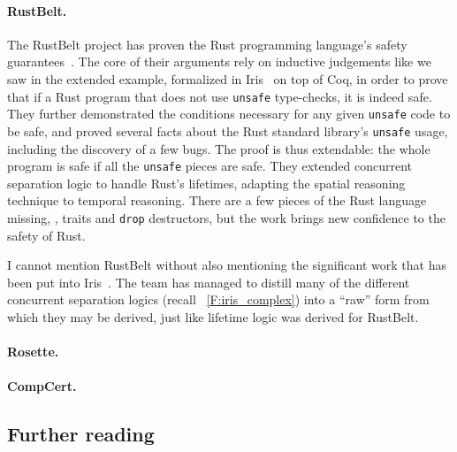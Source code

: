 \paragraph{RustBelt.} The RustBelt project has proven the Rust programming
language's safety guarantees~\cite{Jung_2018a,Jung_2021}. The core of their
arguments rely on inductive judgements like we saw in the extended example,
formalized in Iris~\cite{Jung_2018b} on top of Coq, in order to prove that if a
Rust program that does not use \texttt{unsafe} type-checks, it is indeed safe.
They further demonstrated the conditions necessary for any given \texttt{unsafe}
code to be safe, and proved several facts about the Rust standard library's
\texttt{unsafe} usage, including the discovery of a few bugs. The proof is thus
extendable: the whole program is safe if all the \texttt{unsafe} pieces are
safe. They extended concurrent separation logic to handle Rust's lifetimes,
adapting the spatial reasoning technique to temporal reasoning. There are a few
pieces of the Rust language missing, \eg, traits and \texttt{drop} destructors,
but the work brings new confidence to the safety of Rust.

I cannot mention RustBelt without also mentioning the significant work that has
been put into Iris~\cite{Jung_2015,Jung_2016,Krebbers_2017a,Jung_2018b}. The
team has managed to distill many of the different concurrent separation logics
(recall \figurename~\ref{F:iris_complex}) into a ``raw'' form from which they
may be derived, just like lifetime logic was derived for RustBelt.

\paragraph{Rosette.}

\paragraph{CompCert.}


\subsection{Further reading}\label{S:ex_reading}
